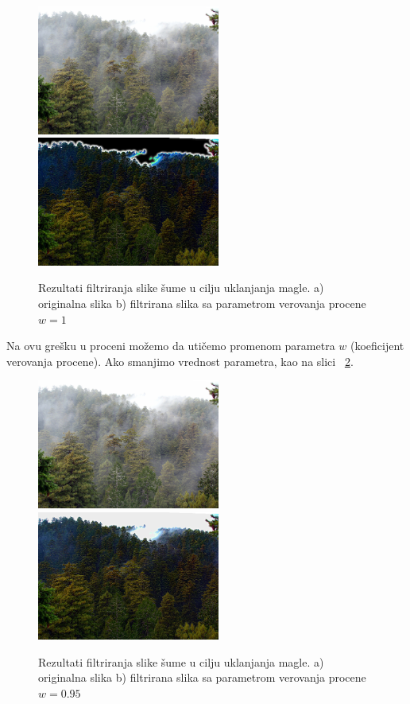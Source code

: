 \documentclass[a4paper,12pt,titlepage]{article}
\begin{document}
\begin{figure}[ht!]
\centering
\includegraphics[width=60mm]{img/forest.png}
\includegraphics[width=60mm]{img/forest100.png}
\caption{Rezultati filtriranja slike šume u cilju uklanjanja magle. a) originalna slika b) filtrirana slika sa parametrom verovanja procene $w = 1$}
\label{Šuma1}
\end{figure} 

Na ovu grešku u proceni možemo da utičemo promenom parametra $w$ (koeficijent verovanja procene). Ako smanjimo vrednost parametra, kao na slici ~\ref{Šuma2}.

\begin{figure}[ht!]
\centering
\includegraphics[width=60mm]{img/forest.png}
\includegraphics[width=60mm]{img/forest95.png}
\caption{Rezultati filtriranja slike šume u cilju uklanjanja magle. a) originalna slika b) filtrirana slika sa parametrom verovanja procene $w = 0.95$}
\label{Šuma2}
\end{figure} 
\end{document}
